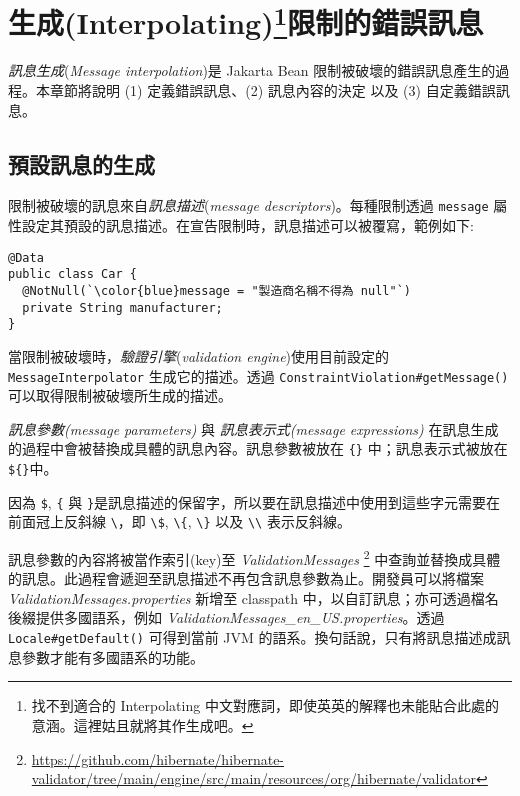 \chapter[]{生成(Interpolating)\footnote{找不到適合的 Interpolating 中文對應詞，即使英英的解釋也未能貼合此處的意涵。這裡姑且就將其作生成吧。}限制的錯誤訊息}

\textit{訊息生成}(\textit{Message interpolation})是 Jakarta Bean 限制被破壞的錯誤訊息產生的過程。本章節將說明 (1) 定義錯誤訊息、(2) 訊息內容的決定 以及 (3) 自定義錯誤訊息。

\section{預設訊息的生成}

限制被破壞的訊息來自\textit{訊息描述}(\textit{message descriptors})。每種限制透過 \texttt{message} 屬性設定其預設的訊息描述。在宣告限制時，訊息描述可以被覆寫，範例如下:

\begin{lstlisting}
@Data
public class Car {
  @NotNull(`\color{blue}message = "製造商名稱不得為 null"`)
  private String manufacturer;
}
\end{lstlisting}

當限制被破壞時，\textit{驗證引擎}(\textit{validation engine})使用目前設定的 \texttt{Message\-Interpolator} 生成它的描述。透過 \texttt{ConstraintViolation\#getMessage()} 可以取得限制被破壞所生成的描述。

\textit{訊息參數(message parameters)} 與 \textit{訊息表示式(message expressions)} 在訊息生成的過程中會被替換成具體的訊息內容。訊息參數被放在 \texttt{\{\}} 中；訊息表示式被放在 \texttt{\$\{\}}中。

因為 \texttt{\$}, \texttt{\{} 與 \texttt{\}}是訊息描述的保留字，所以要在訊息描述中使用到這些字元需要在前面冠上反斜線 \texttt{\textbackslash}，即 \texttt{\textbackslash\$}, \texttt{\textbackslash\{}, \texttt{\textbackslash\}} 以及 \texttt{\textbackslash\textbackslash} 表示反斜線。

訊息參數的內容將被當作索引(key)至 \textit{ValidationMessages} \footnote{\url{https://github.com/hibernate/hibernate-validator/tree/main/engine/src/main/resources/org/hibernate/validator}} 中查詢並替換成具體的訊息。此過程會遞迴至訊息描述不再包含訊息參數為止。開發員可以將檔案 \textit{ValidationMessages.properties} 新增至 classpath 中，以自訂訊息；亦可透過檔名後綴提供多國語系，例如 \textit{ValidationMessages\_en\_US.properties}。透過 \texttt{Locale\#getDefault()} 可得到當前 JVM 的語系。換句話說，只有將訊息描述成訊息參數才能有多國語系的功能。

